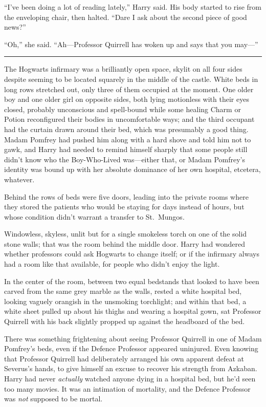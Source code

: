 ``I've been doing a lot of reading lately,'' Harry said. His body
started to rise from the enveloping chair, then halted. ``Dare I ask
about the second piece of good news?''

``Oh,'' she said. ``Ah---Professor Quirrell has woken up and says that
you may---''

\begin{center}\rule{3in}{0.4pt}\end{center}

The Hogwarts infirmary was a brilliantly open space, skylit on all four
sides despite seeming to be located squarely in the middle of the
castle. White beds in long rows stretched out, only three of them
occupied at the moment. One older boy and one older girl on opposite
sides, both lying motionless with their eyes closed, probably
unconscious and spell-bound while some healing Charm or Potion
reconfigured their bodies in uncomfortable ways; and the third occupant
had the curtain drawn around their bed, which was presumably a good
thing. Madam Pomfrey had pushed him along with a hard shove and told him
not to gawk, and Harry had needed to remind himself sharply that some
people still didn't know who the Boy-Who-Lived was---either that, or
Madam Pomfrey's identity was bound up with her absolute dominance of her
own hospital, etcetera, whatever.

Behind the rows of beds were five doors, leading into the private rooms
where they stored the patients who would be staying for days instead of
hours, but whose condition didn't warrant a transfer to St.~Mungos.

Windowless, skyless, unlit but for a single smokeless torch on one of
the solid stone walls; that was the room behind the middle door. Harry
had wondered whether professors could ask Hogwarts to change itself; or
if the infirmary always had a room like that available, for people who
didn't enjoy the light.

In the center of the room, between two equal bedstands that looked to
have been carved from the same grey marble as the walls, rested a white
hospital bed, looking vaguely orangish in the unsmoking torchlight; and
within that bed, a white sheet pulled up about his thighs and wearing a
hospital gown, sat Professor Quirrell with his back slightly propped up
against the headboard of the bed.

There was something frightening about seeing Professor Quirrell in one
of Madam Pomfrey's beds, even if the Defence Professor appeared
uninjured. Even knowing that Professor Quirrell had deliberately
arranged his own apparent defeat at Severus's hands, to give himself an
excuse to recover his strength from Azkaban. Harry had never
\emph{actually} watched anyone dying in a hospital bed, but he'd seen
too many movies. It was an intimation of mortality, and the Defence
Professor was \emph{not} supposed to be mortal.

